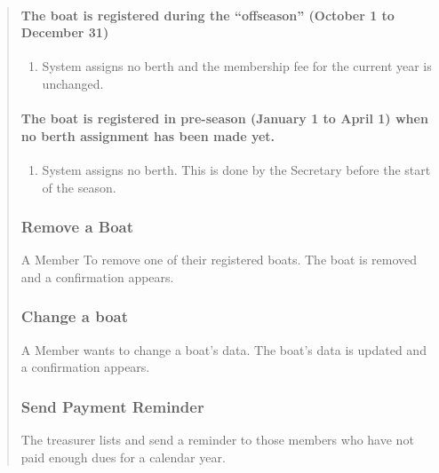 \begin{quote}
\paragraph{The boat is registered during the ``offseason'' (October 1 to December 31)}
\begin{enumerate}
  \tightlist
  \item
    System assigns no berth and the membership fee for the current year is
    unchanged.
\end{enumerate}

\paragraph{The boat is registered in pre-season (January 1 to April 1) when no berth assignment has been made yet.}
\begin{enumerate}
  \tightlist
  \item
    System assigns no berth. This is done by the Secretary before the start
    of the season.
\end{enumerate}


\subsubsection{Remove a Boat}\label{usecase5}

A Member To remove one of their registered boats. The boat is removed
and a confirmation appears.


\subsubsection{Change a boat}\label{usecase6}

A Member wants to change a boat's data. The boat's data is updated and a
confirmation appears.


\subsubsection{Send Payment Reminder}\label{usecase7}

The treasurer lists and send a reminder to those members who have not
paid enough dues for a calendar year.


\end{quote}
